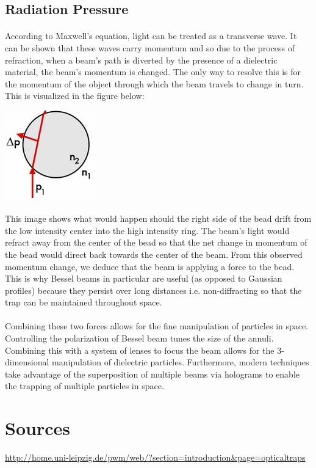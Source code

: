 \documentclass[a4paper, 11pt]{article}
\begin{document}
\subsection*{Radiation Pressure} 
	\paragraph{}
	According to Maxwell's equation, light can be treated as a transverse wave. It can be shown that these waves carry momentum and so due to the process of refraction, when a beam's path is diverted by the presence of a dielectric material, the beam's momentum is changed. The only way to resolve this is for the momentum of the object through which the beam travels to change in turn. This is visualized in the figure below: 
		\begin{center}
			\includegraphics[scale=0.75]{sphereDiffraction}
		\end{center}
	
	\paragraph{}
	This image shows what would happen should the right side of the bead drift from the low intensity center into the high intensity ring. The beam's light would refract away from the center of the bead so that the net change in momentum of the bead would direct back towards the center of the beam. From this observed momentum change, we deduce that the beam is applying a force to the bead. This is why Bessel beams in particular are useful (as opposed to Gaussian profiles) because they persist over long distances i.e. non-diffracting so that the trap can be maintained throughout space.\\
	
\paragraph{}
Combining these two forces allows for the fine manipulation of particles in space. Controlling the polarization of Bessel beam tunes the size of the annuli. Combining this with a system of lenses to focus the beam allows for the 3-dimensional manipulation of dielectric particles. Furthermore, modern techniques take advantage of the superposition of multiple beams via holograms to enable the trapping of multiple particles in space. \\ 
	
	
	
\section*{Sources}  \url{http://home.uni-leipzig.de/pwm/web/?section=introduction&page=opticaltraps} 
	
	
	
	
	
	
	
	
	
	
	
	
	
	
	
	
	
	 
\end{document}
